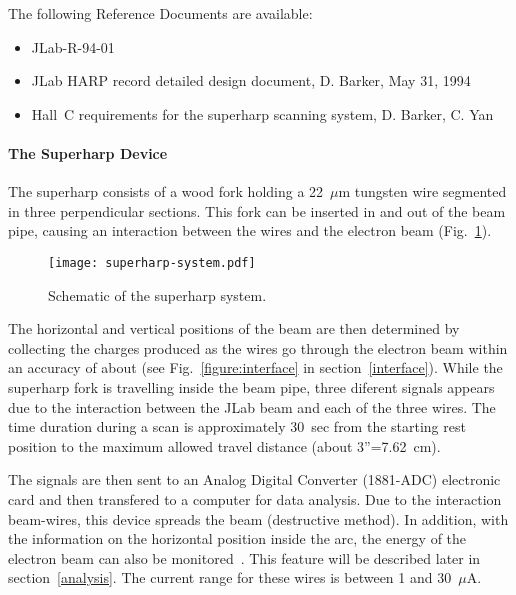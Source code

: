 {The following Reference Documents are available:
\begin{itemize}
\item{JLab-R-94-01}
\item{JLab HARP record detailed design document, D. Barker, May 31, 1994}
\item{Hall~C requirements for the superharp scanning system, D.
Barker, C. Yan}
\end{itemize}


\paragraph{The Superharp Device}\label{system}

The superharp consists of a wood fork holding a 22~$\mu$m tungsten wire segmented in three
perpendicular sections. This fork can be inserted in and out of the beam pipe, causing an
interaction between the wires and the electron beam (Fig.~\ref{figure:superharp}).


\begin{figure}[!hbt]
\begin{center}
\texttt{[image: superharp-system.pdf]}
\caption{Schematic of the superharp system.}
\label{figure:superharp}
\end{center}
\end{figure}

The horizontal and vertical positions of the beam are then determined by collecting the charges
produced as the wires go through the electron beam within an accuracy of about 
(see Fig.~\ref{figure:interface} in section~\ref{interface}). While the superharp fork
is travelling inside the beam pipe, three diferent signals appears due to the interaction
between the JLab beam and each of the three wires. The time duration during a scan is
approximately 30~sec from the starting rest position to the maximum allowed travel distance
(about 3''=7.62~cm).

The signals are then sent to an Analog Digital Converter (1881-ADC) electronic card and then transfered
to a computer for data analysis. Due to the interaction beam-wires, this device spreads the beam
(destructive method). In addition, with the information on the horizontal position inside the arc, the
energy of the electron beam can also be monitored~\cite{Gueye-98-energy}. This feature will be described
later in section~\ref{analysis}. The current range for these wires is
between 1 and 30~$\mu$A.  

}
